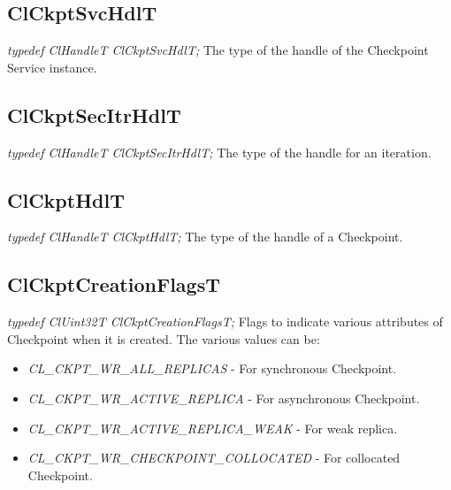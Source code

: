 \begin{flushleft}
\subsection{ClCkptSvcHdlT}
\textit{typedef ClHandleT ClCkptSvcHdlT;}
\newline
\newline
The type of the handle of the Checkpoint Service instance. 


\subsection{ClCkptSecItrHdlT}
\textit{typedef ClHandleT ClCkptSecItrHdlT;}
\newline
\newline
The type of the handle for an iteration.


\subsection{ClCkptHdlT}
\textit{typedef ClHandleT ClCkptHdlT;}
\newline
\newline
The type of the handle of a Checkpoint.


\subsection{ClCkptCreationFlagsT}
\textit{typedef ClUint32T  ClCkptCreationFlagsT;}
\newline
\newline
Flags to indicate various attributes of Checkpoint when it is created. The various values can be:
\begin{itemize}
\item
\textit{CL\_\-CKPT\_\-WR\_\-ALL\_\-REPLICAS} - For synchronous Checkpoint.
\item
\textit{CL\_\-CKPT\_\-WR\_\-ACTIVE\_\-REPLICA} - For asynchronous Checkpoint.
\item
\textit{CL\_\-CKPT\_\-WR\_\-ACTIVE\_\-REPLICA\_\-WEAK} - For weak replica.
\item
\textit{CL\_\-CKPT\_\-WR\_\-CHECKPOINT\_\-COLLOCATED} - For collocated Checkpoint.
\end{itemize}



\end{flushleft}
